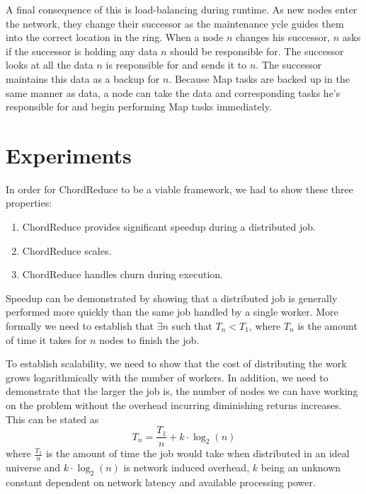 A final consequence of this is load-balancing during runtime.  As new nodes enter the network, they change their successor as the maintenance  ycle guides them into the correct location in the ring.  When a node $n$ changes his successor, $n$ asks if the successor is holding any data $n$ should be responsible for.  The successor looks at all the data $n$ is responsible for and sends it to $n$.  The successor maintains this data as a backup for $n$.  Because Map tasks are backed up in the same manner as data, a node can take the data and corresponding tasks he's responsible for and begin performing Map tasks immediately.





\section{Experiments}

In order for ChordReduce to be a viable framework, we had to show these three properties:
\begin{enumerate}
    \item ChordReduce provides significant speedup during a distributed job.
    \item ChordReduce scales.
    \item ChordReduce handles churn during execution.
\end{enumerate}
Speedup can be demonstrated by showing that a distributed job is generally performed more quickly than the same job handled by a single worker.  More formally we need to establish that $\exists n$ such that $T_{n} < T_{1}$, where $T_{n}$ is the amount of time it takes for $n$ nodes to finish the job.

To establish scalability, we need to show that the cost of distributing the work grows logarithmically with the number of workers.  In addition, we need to demonstrate that the larger the job is, the number of nodes we can have working on the problem without the overhead incurring diminishing returns increases. This can be stated as $$T_{n} = \frac{T_{1}}{n} + k \cdot \log_{2}(n)$$ where $\frac{T_{1}}{n}$ is the amount of time the job would take when distributed in an ideal universe and $k \cdot \log_{2}(n)$ is network induced overhead, $k$ being an unknown constant dependent on network latency and available processing power.

